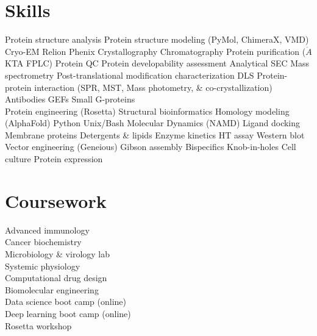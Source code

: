 \documentclass[]{deedy-resume-openfont}
\begin{document}
\begin{minipage}[t]{0.32\textwidth}

\section{Skills}
Protein structure analysis \textbullet{} Protein structure modeling (PyMol, ChimeraX, VMD) \textbullet{} Cryo-EM \textbullet{} Relion \textbullet{} Phenix \textbullet{} Crystallography \textbullet{} Chromatography \textbullet{} Protein purification ($\ddot{A}$KTA FPLC) \textbullet{} Protein QC \textbullet{} Protein developability assessment \textbullet{} Analytical SEC \textbullet{} Mass spectrometry \textbullet{} Post-translational modification characterization \textbullet{} DLS \textbullet{} Protein-protein interaction (SPR, MST, Mass photometry, \& co-crystallization) \textbullet{} Antibodies \textbullet{} GEFs \textbullet{} Small G-proteins \\ 
Protein engineering (Rosetta) \textbullet{} Structural bioinformatics \textbullet{} Homology modeling (AlphaFold) \textbullet{} Python \textbullet{} Unix/Bash \textbullet{} Molecular Dynamics (NAMD) \textbullet{} Ligand docking \textbullet{} Membrane proteins \textbullet{} Detergents \& lipids \textbullet{} Enzyme kinetics \textbullet{} HT assay \textbullet{} Western blot \textbullet{} Vector engineering (Geneious) \textbullet{} Gibson assembly \textbullet{} Bispecifics \textbullet{} Knob-in-holes \textbullet{} Cell culture \textbullet{} Protein expression \\



\section{Coursework}
Advanced immunology \\
Cancer biochemistry \\
Microbiology \& virology lab \\
Systemic physiology \\
Computational drug design \\
Biomolecular engineering \\
Data science boot camp (online) \\
Deep learning boot camp (online) \\
Rosetta workshop \\


\end{minipage}
\end{document}
